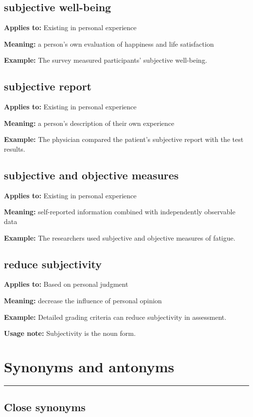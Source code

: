 \documentclass[11pt]{article}
\newcommand{\sectionrule}{\par\vspace{-0.5em}\noindent\textcolor{Accent}{\rule{\linewidth}{0.6pt}}\par}
\begin{document}
\subsection{subjective well-being}
\textbf{Applies to:} Existing in personal experience

\textbf{Meaning:} a person's own evaluation of happiness and life satisfaction

\textbf{Example:} The survey measured participants' subjective well-being.

\subsection{subjective report}
\textbf{Applies to:} Existing in personal experience

\textbf{Meaning:} a person's description of their own experience

\textbf{Example:} The physician compared the patient's subjective report with the test results.

\subsection{subjective and objective measures}
\textbf{Applies to:} Existing in personal experience

\textbf{Meaning:} self-reported information combined with independently observable data

\textbf{Example:} The researchers used subjective and objective measures of fatigue.

\subsection{reduce subjectivity}
\textbf{Applies to:} Based on personal judgment

\textbf{Meaning:} decrease the influence of personal opinion

\textbf{Example:} Detailed grading criteria can reduce subjectivity in assessment.

\textbf{Usage note:} Subjectivity is the noun form.

\section{Synonyms and antonyms}
\sectionrule
\subsection{Close synonyms}
\end{document}
